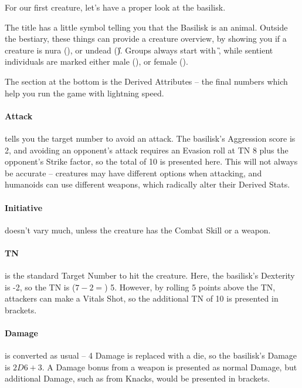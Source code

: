 \begin{multicols}{2}

For our first creature, let's have a proper look at the basilisk.

\basilisk

The title has a little symbol telling you that the Basilisk is an animal.
Outside the bestiary, these things can provide a creature overview, by showing you if a creature is  nura (\N), or undead (\U).
Groups always start with \G, while sentient individuals are marked either male (\M), or female (\F).

The section at the bottom is the Derived Attributes -- the final numbers which help you run the game with lightning speed.

\paragraph{Attack} tells you the target number to avoid an attack.  The basilisk's Aggression score is 2, and avoiding an opponent's attack requires an Evasion roll at TN 8 plus the opponent's Strike factor, so the total of 10 is presented here.  This will not always be accurate -- creatures may have different options when attacking, and humanoids can use different weapons, which radically alter their Derived Stats.

\paragraph{Initiative} doesn't vary much, unless the creature has the Combat Skill or a weapon.

\paragraph{TN} is the standard Target Number to hit the creature.  Here, the basilisk's Dexterity is -2, so the TN is ($7 - 2 =$) 5.  However, by rolling 5 points above the TN, attackers can make a Vitals Shot, so the additional TN of 10 is presented in brackets.

\paragraph{Damage} is converted as usual -- 4 Damage is replaced with a die, so the basilisk's Damage is $2D6+3$.  A Damage bonus from a weapon is presented as normal Damage, but additional Damage, such as from Knacks, would be presented in brackets.


\end{multicols}
